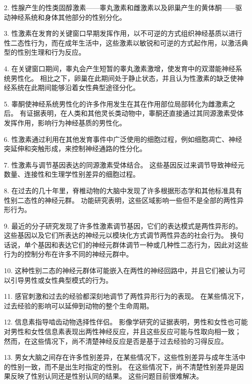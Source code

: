 2. 性腺产生的性类固醇激素——睾丸激素和雌激素以及卵巢产生的黄体酮——驱动神经系统和身体其他部分的性别分化。 


3. 性激素在发育的关键窗口早期发挥作用，以不可逆的方式组织神经基质以进行性二态性行为，而在成年生活中，这些激素以敏锐和可逆的方式起作用，以激活典型的性别生理和行为反应。 


4. 在关键窗口期间，睾丸会产生短暂的睾丸激素激增，使发育中的双潜能神经系统男性化。
相比之下，卵巢在此期间处于静止状态，并且认为性激素的缺乏使神经系统在此期间能够沿着女性典型途径分化。 


5. 睾酮使神经系统男性化的许多作用发生在其在作用部位局部转化为雌激素之后。
有证据表明，在人类和其他灵长类动物中，睾酮还直接通过其同源激素受体发挥作用，影响行为神经基质的男性化。


6. 性激素通过利用在其他发育事件中广泛使用的细胞过程，例如细胞凋亡、神经突延伸和突触形成，来控制神经通路的性分化。 


7. 性激素与调节基因表达的同源激素受体结合。
这些基因反过来调节导致神经元数量、连接性和生理学性别差异的细胞过程。


8. 在过去的几十年里，脊椎动物的大脑中发现了许多根据形态学和其他标准具有性别二态性的神经元群。
功能研究表明，这些区域影响一些但不是全部的两性异形行为。


9. 最近的分子研究发现了许多性激素调节基因，它们的表达模式是两性异形的。
这些基因以及它们所表达的神经元以模块化方式调节两性异态的社会行为。
换句话说，单个基因和表达它们的神经元群体调节一种或几种性二态行为，因此对这些行为的控制分布在许多不同的神经元群中。


10. 这种性别二态的神经元群体可能嵌入在两性的神经回路中，并且它们被认为可以引导男性或女性典型模式的行为。


11. 感官刺激和过去的经验都深刻地调节了两性异形行为的表现。
在某些情况下，过去经验的影响可以延伸到动物的整个生命周期。


12. 信息素指导啮齿动物选择性伴侣。
影像学研究的证据表明，男性和女性也可能对男性和女性信息素表现出两性神经反应，并且这些反应可能与性取向相一致；
然而，在这些情况下，尚不清楚神经反应是否是基于过去经验的习得反应。


13. 男女大脑之间存在许多性别差异，在某些情况下，这些性别差异与成年生活中的性别一致，而不是出生时指定的性别。
在这些情况下，尚不清楚性别差异是因果反映了性别认同还是性别认同的结果。
这些问题目前很难解决。



